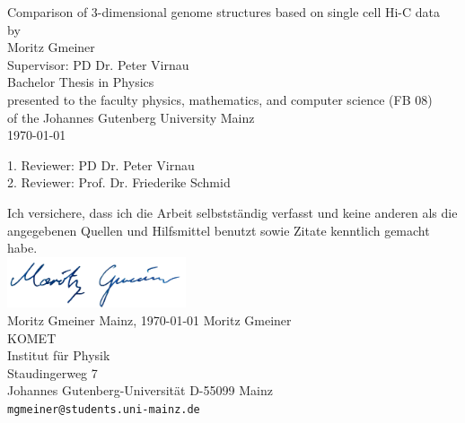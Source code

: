 \documentclass[a4paper,11pt,oneside,final,english,toc=bib]{scrbook}
\begin{document}

\begin{titlepage}
  \vspace*{6mm}
  \begin{center}
     {\afont Comparison of 3-dimensional genome structures based on single cell Hi-C data}
     \\[3.5cm]
     {\large by}
     \\[3.5cm]
     {\dfont Moritz Gmeiner}
     \\[1.5cm]
     {\dfont Supervisor: PD Dr. Peter Virnau}
     \\[2cm]
     {\large Bachelor Thesis in Physics \/\\
        presented to the faculty physics, mathematics, and computer science (FB 08) \/\\
        of the Johannes Gutenberg University Mainz \/\\
        \today}
   \end{center}
   \vfill
   1. Reviewer: PD Dr. Peter Virnau \\	
   2. Reviewer: Prof. Dr. Friederike Schmid \\
   \vfill
\end{titlepage}

\thispagestyle{empty}
Ich versichere, dass ich die Arbeit selbstständig verfasst und keine 
anderen als die angegebenen Quellen und Hilfsmittel benutzt sowie 
Zitate kenntlich gemacht habe.
\\[1cm]
\includegraphics[height=1.5cm]{Unterschrift.png} \\
Moritz Gmeiner \hfill Mainz, \today
\vfill
\noindent 
Moritz Gmeiner\\
KOMET\\
Institut für Physik\\
Staudingerweg 7\\
Johannes Gutenberg-Universität
D-55099 Mainz\\
{ \texttt{mgmeiner@students.uni-mainz.de} }
\end{document}

